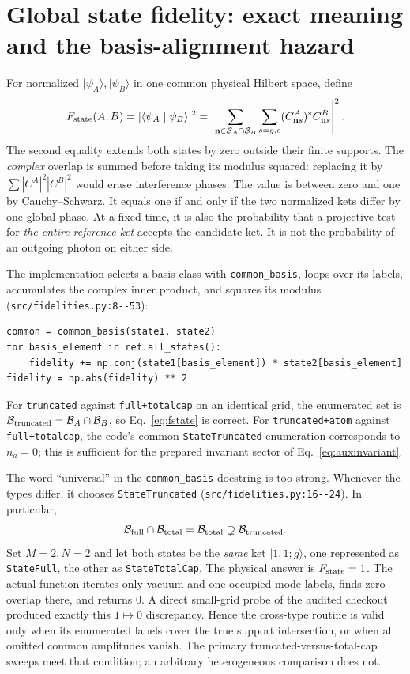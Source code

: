 \documentclass[11pt,a4paper]{article}
\newcommand{\ket}[1]{\lvert #1\rangle}
\newcommand{\braket}[2]{\langle #1\mid #2\rangle}
\newcommand{\code}[1]{\nolinkurl{#1}}
\newcommand{\BB}{\mathcal B}
\begin{document}
\section{Global state fidelity: exact meaning and the basis-alignment hazard}
\label{sec:global}
For normalized $\ket{\psi_A},\ket{\psi_B}$ in one common physical Hilbert space, define
\begin{equation}
 F_{\rm state}(A,B)
 =|\braket{\psi_A}{\psi_B}|^2
 =\left|\sum_{\mathbf n\in\BB_A\cap\BB_B}\sum_{s=g,e}
 (C^A_{\mathbf n s})^*C^B_{\mathbf n s}\right|^2.
 \label{eq:fstate}
\end{equation}
The second equality extends both states by zero outside their finite supports. The \emph{complex} overlap is summed before taking its modulus squared: replacing it by $\sum|C^A|^2|C^B|^2$ would erase interference phases. The value is between zero and one by Cauchy--Schwarz. It equals one if and only if the two normalized kets differ by one global phase. At a fixed time, it is also the probability that a projective test for \emph{the entire reference ket} accepts the candidate ket. It is not the probability of an outgoing photon on either side.

The implementation selects a basis class with \code{common_basis}, loops over its labels, accumulates the complex inner product, and squares its modulus (\code{src/fidelities.py:8--53}):
\begin{lstlisting}
common = common_basis(state1, state2)
for basis_element in ref.all_states():
    fidelity += np.conj(state1[basis_element]) * state2[basis_element]
fidelity = np.abs(fidelity) ** 2
\end{lstlisting}
For \code{truncated} against \code{full+totalcap} on an identical grid, the enumerated set is $\BB_{\rm truncated}=\BB_A\cap\BB_B$, so Eq.~\eqref{eq:fstate} is correct. For \code{truncated+atom} against \code{full+totalcap}, the code's common \code{StateTruncated} enumeration corresponds to $n_a=0$; this is sufficient for the prepared invariant sector of Eq.~\eqref{eq:auxinvariant}.

The word ``universal'' in the \code{common_basis} docstring is too strong. Whenever the types differ, it chooses \code{StateTruncated} (\code{src/fidelities.py:16--24}). In particular,
\begin{equation}
 \BB_{\rm full}\cap\BB_{\rm total}=\BB_{\rm total}
 \supsetneq\BB_{\rm truncated}.
\end{equation}
Set $M=2,N=2$ and let both states be the \emph{same} ket $\ket{1,1;g}$, one represented as \code{StateFull}, the other as \code{StateTotalCap}. The physical answer is $F_{\rm state}=1$. The actual function iterates only vacuum and one-occupied-mode labels, finds zero overlap there, and returns $0$. A direct small-grid probe of the audited checkout produced exactly this $1\mapsto0$ discrepancy. Hence the cross-type routine is valid only when its enumerated labels cover the true support intersection, or when all omitted common amplitudes vanish. The primary truncated-versus-total-cap sweeps meet that condition; an arbitrary heterogeneous comparison does not.
\end{document}

